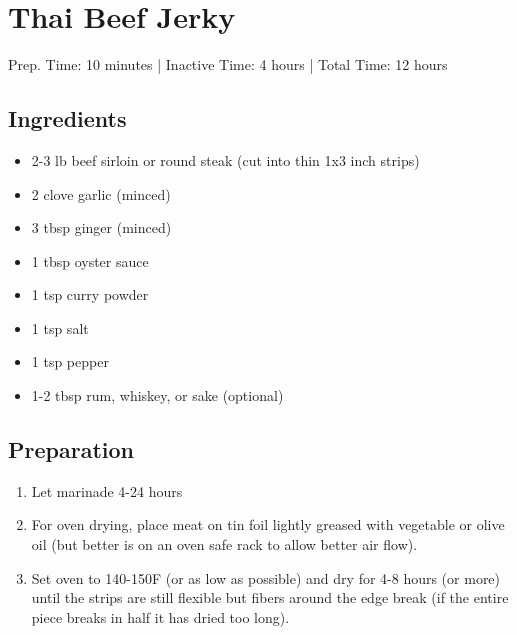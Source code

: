 \section{Thai Beef Jerky}

Prep. Time: 10 minutes |
Inactive Time: 4 hours |
Total Time: 12 hours

\subsection{Ingredients}
\begin{itemize}
    \item 2-3 lb beef sirloin or round steak (cut into thin 1x3 inch strips)
    \item 2 clove garlic (minced)
    \item 3 tbsp ginger (minced)
    \item 1 tbsp oyster sauce
    \item 1 tsp curry powder
    \item 1 tsp salt
    \item 1 tsp pepper
    \item 1-2 tbsp rum, whiskey, or sake (optional)
\end{itemize}

\subsection{Preparation}
\begin{enumerate}
    \item Let marinade 4-24 hours
    \item For oven drying, place meat on tin foil lightly greased with vegetable or olive oil (but better is on an oven safe rack to allow better air flow). 
    \item Set oven to 140-150F (or as low as possible) and dry for 4-8 hours (or more) until the strips are still flexible but fibers around the edge break (if the entire piece breaks in half it has dried too long).
\end{enumerate}
